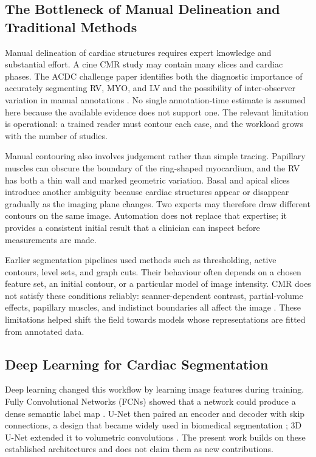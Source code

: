 \subsection{The Bottleneck of Manual Delineation and Traditional Methods}
Manual delineation of cardiac structures requires expert knowledge and substantial effort. A cine CMR study may contain many slices and cardiac phases. The ACDC challenge paper identifies both the diagnostic importance of accurately segmenting RV, MYO, and LV and the possibility of inter-observer variation in manual annotations \citep{bernard2018deep}. No single annotation-time estimate is assumed here because the available evidence does not support one. The relevant limitation is operational: a trained reader must contour each case, and the workload grows with the number of studies.

Manual contouring also involves judgement rather than simple tracing. Papillary muscles can obscure the boundary of the ring-shaped myocardium, and the RV has both a thin wall and marked geometric variation. Basal and apical slices introduce another ambiguity because cardiac structures appear or disappear gradually as the imaging plane changes. Two experts may therefore draw different contours on the same image. Automation does not replace that expertise; it provides a consistent initial result that a clinician can inspect before measurements are made.

Earlier segmentation pipelines used methods such as thresholding, active contours, level sets, and graph cuts. Their behaviour often depends on a chosen feature set, an initial contour, or a particular model of image intensity. CMR does not satisfy these conditions reliably: scanner-dependent contrast, partial-volume effects, papillary muscles, and indistinct boundaries all affect the image \citep{chen2020cardiacreview}. These limitations helped shift the field towards models whose representations are fitted from annotated data.

\subsection{Deep Learning for Cardiac Segmentation}
Deep learning changed this workflow by learning image features during training. Fully Convolutional Networks (FCNs) showed that a network could produce a dense semantic label map \citep{long2015fully}. U-Net then paired an encoder and decoder with skip connections, a design that became widely used in biomedical segmentation \citep{ronneberger2015u}; 3D U-Net extended it to volumetric convolutions \citep{cicek20163d}. The present work builds on these established architectures and does not claim them as new contributions.

